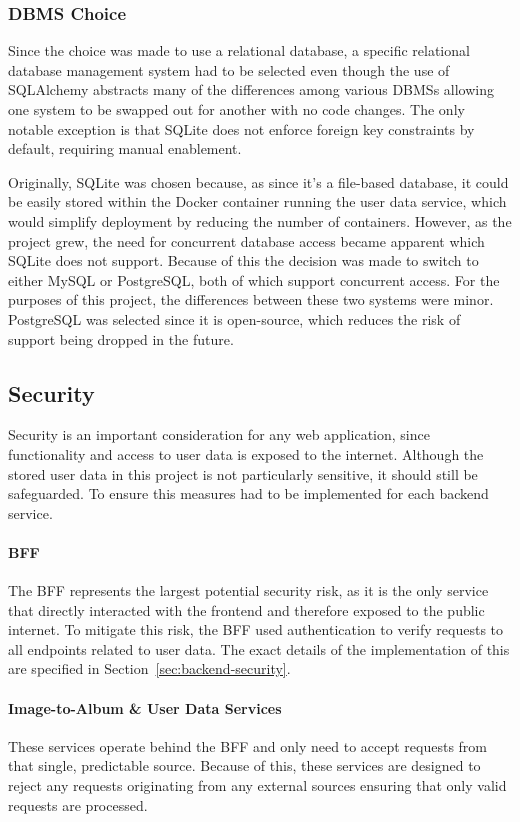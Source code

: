 \subsubsection{DBMS Choice}
Since the choice was made to use a relational database, a specific relational database management system had to be selected even though the use of SQLAlchemy abstracts many of the differences among various DBMSs allowing one system to be swapped out for another with no code changes. The only notable exception is that SQLite does not enforce foreign key constraints by default, requiring manual enablement.

Originally, SQLite was chosen because, as since it's a file-based database, it could be easily stored within the Docker container running the user data service, which would simplify deployment by reducing the number of containers. However, as the project grew, the need for concurrent database access became apparent which SQLite does not support. Because of this the decision was made to switch to either MySQL or PostgreSQL, both of which support concurrent access. For the purposes of this project, the differences between these two systems were minor. PostgreSQL was selected since it is open-source, which reduces the risk of support being dropped in the future.

\subsection{Security}
Security is an important consideration for any web application, since functionality and access to user data is exposed to the internet. Although the stored user data in this project is not particularly sensitive, it should still be safeguarded. To ensure this measures had to be implemented for each backend service.

\paragraph{BFF} The BFF represents the largest potential security risk, as it is the only service that directly interacted with the frontend and therefore exposed to the public internet. To mitigate this risk, the BFF used authentication to verify requests to all endpoints related to user data. The exact details of the implementation of this are specified in Section~\ref{sec:backend-security}.

\paragraph{Image-to-Album \& User Data Services} These services operate behind the BFF and only need to accept requests from that single, predictable source. Because of this, these services are designed to reject any requests originating from any external sources ensuring that only valid requests are processed.

